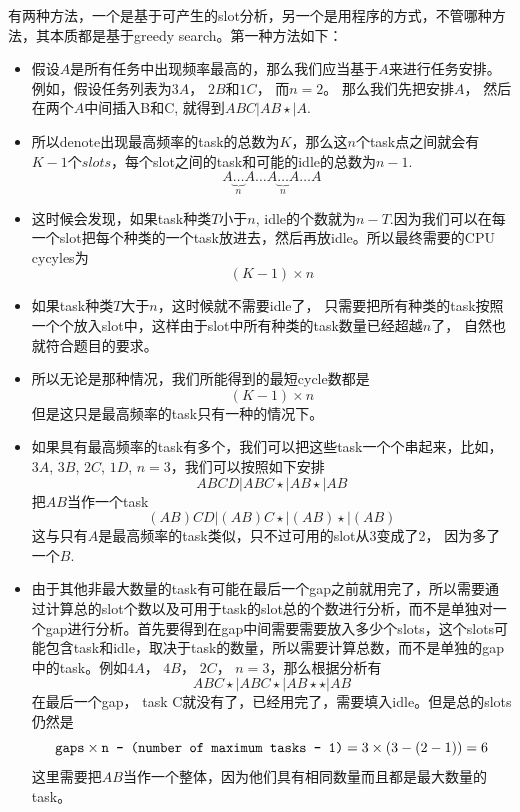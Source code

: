 \documentclass[a4paper,12pt]{article}
\begin{document}
\begin{CJK*}{UTF8}{gbsn}
	有两种方法，一个是基于可产生的slot分析，另一个是用程序的方式，不管哪种方法，其本质都是基于greedy search。第一种方法如下：
	\begin{itemize}
		\item 假设$A$是所有任务中出现频率最高的，那么我们应当基于$A$来进行任务安排。例如，假设任务列表为$3A$， $2B$和$1C$， 而$n=2$。 那么我们先把安排$A$， 然后在两个$A$中间插入B和C, 就得到$ABC|AB\star|A$.
		\item 所以denote出现最高频率的task的总数为$K$，那么这$n$个task点之间就会有$K-1$个$slots$，每个slot之间的task和可能的idle的总数为$n-1$.
		$$
		A\underbrace{\ldots}_{n}A\ldots A\underbrace{\ldots}_{n}A\ldots A
		$$
		\item 这时候会发现，如果task种类$T$小于$n$, idle的个数就为$n-T$.因为我们可以在每一个slot把每个种类的一个task放进去，然后再放idle。所以最终需要的CPU cycyles为
		$$
		(K-1)\times n
		$$
		\item 如果task种类$T$大于$n$，这时候就不需要idle了， 只需要把所有种类的task按照一个个放入slot中，这样由于slot中所有种类的task数量已经超越$n$了， 自然也就符合题目的要求。
		\item 所以无论是那种情况，我们所能得到的最短cycle数都是
		$$
		(K-1)\times n
		$$
		但是这只是最高频率的task只有一种的情况下。
		\item 如果具有最高频率的task有多个，我们可以把这些task一个个串起来，比如，$3A$, $3B$, $2C$, $1D$, $n=3$，我们可以按照如下安排
		$$
		ABCD|ABC\star|AB\star|AB
		$$
		把$AB$当作一个task
		$$
		(AB)CD|(AB)C\star|(AB)\star|(AB)
		$$
		这与只有$A$是最高频率的task类似，只不过可用的slot从3变成了2， 因为多了一个$B$.
		\item 由于其他非最大数量的task有可能在最后一个gap之前就用完了，所以需要通过计算总的slot个数以及可用于task的slot总的个数进行分析，而不是单独对一个gap进行分析。首先要得到在gap中间需要需要放入多少个slots，这个slots可能包含task和idle，取决于task的数量，所以需要计算总数，而不是单独的gap中的task。例如$4A$， $4B$， $2C$， $n=3$，那么根据分析有
		$$
		ABC\star|ABC\star|AB\star\star|AB
		$$
		在最后一个gap， task C就没有了，已经用完了，需要填入idle。但是总的slots仍然是
		$$
		\texttt{gaps}\times \texttt{n - (\texttt{number of maximum tasks - 1)}} = 3 \times(3 - (2-1))=6
		$$
		这里需要把$AB$当作一个整体，因为他们具有相同数量而且都是最大数量的task。
	

\end{itemize}
\end{CJK*}
\end{document}
